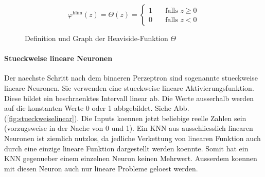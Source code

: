 \documentclass[../main]{subfiles}
\begin{document}
\begin{figure}[h!]
  \begin{minipage}[h!]{0.5\textwidth}
    \begin{equation*}
      \varphi^{\text{hlim}}(z) = \Theta(z) =
      \begin{cases}
        1 & \quad \text{falls } z \geq 0\\
        0 & \quad \text{falls } z < 0
      \end{cases}
    \end{equation*}

  \end{minipage}
  \begin{minipage}[h!]{0.5\textwidth}
    \centering
  \end{minipage}

  \caption{Definition und Graph der Heaviside-Funktion $\Theta$}
  \label{fig:heaviside}
\end{figure}

\paragraph{Stueckweise lineare Neuronen}
Der naechste Schritt nach dem binaeren Perzeptron sind sogenannte stueckweise
lineare Neuronen.
Sie verwenden eine stueckweise lineare Aktivierungsfunktion. Diese bildet ein
beschraenktes Intervall linear ab. Die Werte ausserhalb werden auf die
konstanten Werte 0 oder 1 abbgebildet. Siehe Abb. (\ref{fig:stueckweiselinear}).
\para
Die Inputs koennen jetzt beliebige reelle Zahlen sein (vorzugsweise in der Naehe
von 0 und 1).
Ein KNN aus ausschliesslich linearen Neuronen ist ziemlich nutzlos, da jedliche Verkettung von
linearen Funktion auch durch eine einzige lineare Funktion dargestellt werden
koennte. Somit hat ein KNN gegenueber einem einzelnen Neuron keinen Mehrwert.
Ausserdem koennen mit diesen Neuron auch nur lineare Probleme geloest werden.
\end{document}
